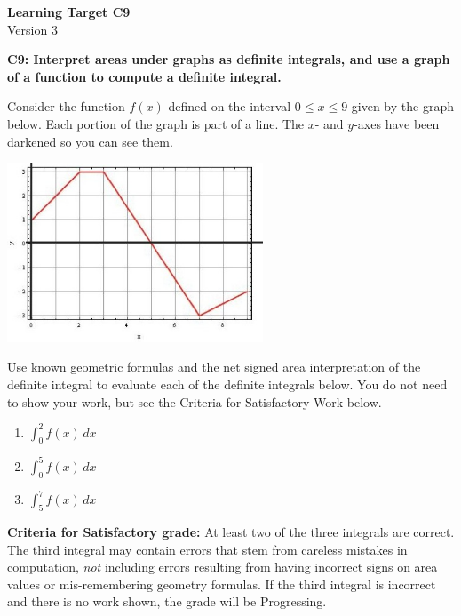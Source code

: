 \documentclass[10pt]{article}
\begin{document}
	\vspace*{0in}

		\begin{center}
			\textbf{Learning Target C9} \\
			{Version 3} \\
		\end{center}

\begin{framed}
	\textbf{C9: Interpret areas under graphs as definite integrals, and use a graph of a function to compute a definite integral.
}
\end{framed}

Consider the function $f(x)$ defined on the interval $0 \leq x \leq 9$ given by the graph below. Each portion of the graph is part of a line. The $x$- and $y$-axes have been darkened so you can see them. 

\begin{center}
    \includegraphics[width=3in]{ltc9-dec5.jpg}
\end{center}

Use known geometric formulas and the net signed area interpretation of the definite integral to evaluate each of the definite integrals below. You do not need to show your work, but see the Criteria for Satisfactory Work below. 

\begin{enumerate}
    \item $\displaystyle{\int_0^2 f(x) \, dx}$
    \item $\displaystyle{\int_0^5 f(x) \, dx}$
    \item $\displaystyle{\int_5^7 f(x) \, dx}$
\end{enumerate}


\vfill


\begin{small}
    \begin{framed}
        	\textbf{Criteria for Satisfactory grade:} At least two of the three integrals are correct. The third integral may contain errors that stem from careless mistakes in computation, \emph{not} including errors resulting from having incorrect signs on area values or mis-remembering geometry formulas. If the third integral is incorrect and there is no work shown, the grade will be Progressing. 
    \end{framed}
\end{small}
\end{document}
